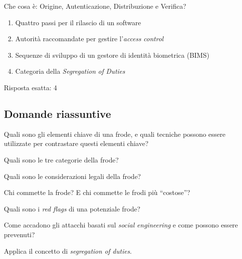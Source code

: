 \begin{Exercise} [
  title={Definizioni},
  label={fr6}
 ]

 \Question Che cosa è: Origine, Autenticazione, Distribuzione e Verifica?

 \begin{enumerate}
  \item Quattro passi per il rilascio di un software
  \item Autorità raccomandate per gestire l'\textit{access control}
  \item Sequenze di sviluppo di un gestore di identità biometrica (BIMS)
  \item Categoria della \textit{Segregation of Duties}
 \end{enumerate}

\end{Exercise}

\begin{Answer} [
  ref={fr6},
  number={6}
 ]

 \Question Risposta esatta: 4
\end{Answer}



\subsection{Domande riassuntive}
\label{EsFrodi3}

\begin{Exercise} [
  title={Domande riassuntive},
  label={fr7}
 ]

 \Question Quali sono gli elementi chiave di una frode, e quali tecniche
possono essere utilizzate per contrastare questi elementi chiave?

 \Question Quali sono le tre categorie della frode?

 \Question Quali sono le considerazioni legali della frode?

 \Question Chi commette la frode? E chi commette le frodi più ``costose''?

 \Question Quali sono i \textit{red flags} di una potenziale frode?

 \Question Come accadono gli attacchi basati sul \textit{social engineering} e
come possono essere prevenuti?

 \Question Applica il concetto di \textit{segregation of duties}. %

\end{Exercise}

